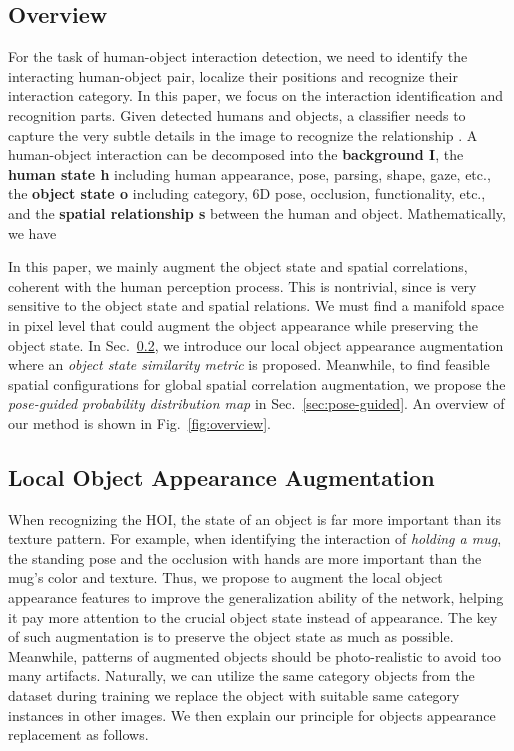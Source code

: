 \documentclass[10pt,twocolumn,letterpaper]{article}
\begin{document}
\subsection{Overview}
For the task of human-object interaction detection, we need to identify the interacting human-object pair, localize their positions and recognize their interaction category. In this paper, we focus on the interaction identification and recognition parts. Given detected humans and objects, a classifier  needs to capture the very subtle details in the image to recognize the relationship . A human-object interaction can be decomposed into the \textbf{background I}, the \textbf{human state h} including human appearance, pose, parsing, shape, gaze, etc., the \textbf{object state o} including category, 6D pose, occlusion, functionality, etc., and the \textbf{spatial relationship s} between the human and object. Mathematically, we have

In this paper, we mainly augment the object state and spatial correlations, coherent with the human perception process.
This is nontrivial, since  is very sensitive to the object state and spatial relations. We must find a manifold space in pixel level that could augment the object appearance while preserving the object state. In Sec.~\ref{sec:object exchange}, we introduce our local object appearance augmentation where an \textit{object state similarity metric} is proposed. Meanwhile, to find feasible spatial configurations for global spatial correlation augmentation, we propose the \textit{pose-guided probability distribution map} in Sec.~\ref{sec:pose-guided}. An overview of our method is shown in Fig.~\ref{fig:overview}.

\subsection{Local Object Appearance Augmentation}
\label{sec:object exchange}
When recognizing the HOI, the state of an object is far more important than its texture pattern. For example, when identifying the interaction of \textit{holding a mug}, the standing pose and the occlusion with hands are more important than the mug's color and texture. Thus, we propose to augment the local object appearance features to improve the generalization ability of the network, helping it pay more attention to the crucial object state instead of appearance. The key of such augmentation is to preserve the object state as much as possible. Meanwhile, patterns of augmented objects should be photo-realistic to avoid too many artifacts. Naturally, we can utilize the same category objects from the dataset during training  we replace the object with suitable same category instances in other images. We then explain our principle for objects appearance replacement as follows.
\end{document}
